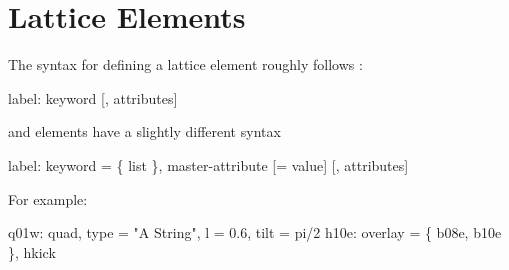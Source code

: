 \section{Lattice Elements}

The syntax for defining a lattice element roughly follows \mad:
\begin{example}
  label: keyword [, attributes]
\end{example}
 and  elements have a slightly different syntax
\begin{example}
  label: keyword = \{ list \}, master-attribute [= value] [, attributes]
\end{example}
For example:
\begin{example}
  q01w: quad, type = "A String", l = 0.6, tilt = pi/2
  h10e: overlay = \{ b08e, b10e \}, hkick
\end{example}
